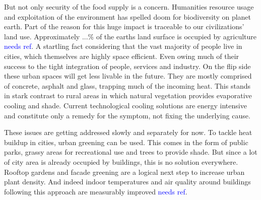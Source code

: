 But not only security of the food supply is a concern.
Humanities resource usage and exploitation of the environment has spelled doom for biodiversity on planet earth.
Part of the reason for this huge impact is traceable to our civilizations' land use.
Approximately ...\% of the earths land surface is occupied by agriculture \textcolor{Blue}{needs ref}.
A startling fact considering that the vast majority of people live in cities, which themselves are highly space efficient.
Even owing much of their success to the tight integration of people, services and industry.
On the flip side these urban spaces will get less livable in the future.
They are mostly comprised of concrete, asphalt and glass, trapping much of the incoming heat.
This stands in stark contrast to rural areas in which natural vegetation provides evaporative cooling and shade.
Current technological cooling solutions are energy intensive and constitute only a remedy for the symptom, not fixing the underlying cause.



These issues are getting addressed slowly and separately for now.
To tackle heat buildup in cities, urban greening can be used.
This comes in the form of public parks, grassy areas for recreational use and trees to provide shade.
But since a lot of city area is already occupied by buildings, this is no solution everywhere.
Rooftop gardens and facade greening are a logical next step to increase urban plant density.
And indeed indoor temperatures and air quality around buildings following this approach are measurably improved \textcolor{Blue}{needs ref}.


